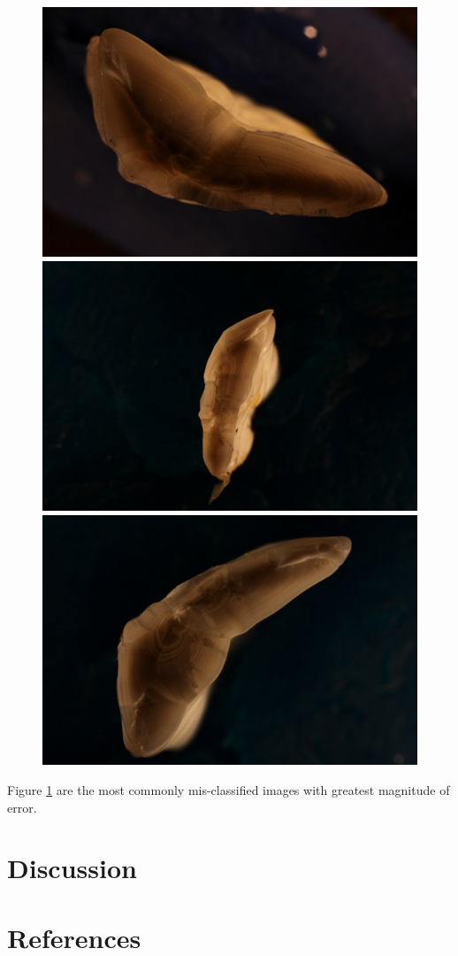 \documentclass[10pt,letterpaper]{article}
\begin{document}
\begin{figure}[h!]
  \includegraphics[scale=0.1]{outliers/IMG_0044_342.JPG}
  \includegraphics[scale=0.1]{outliers/IMG_0086_360.JPG}
  \includegraphics[scale=0.1]{outliers/IMG_0122_369.JPG}
  \label{marker7}
\end{figure}

Figure \ref{marker7} are the most commonly mis-classified images 
with greatest magnitude of error.


\section*{Discussion}


\section*{References}



\end{document}

